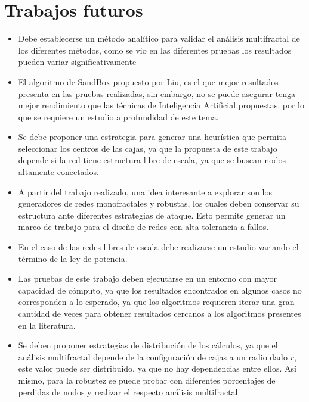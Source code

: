 \newpage
\section{Trabajos futuros}

\begin{itemize}
    \item Debe establecerse un método analítico para validar el análisis multifractal de los diferentes métodos, como se vio en las diferentes pruebas los resultados pueden variar significativamente
    \item El algoritmo de SandBox propuesto por Liu\cite{Liu2015}, es el que mejor resultados presenta en las pruebas realizadas, sin embargo, no se puede asegurar tenga mejor rendimiento que las técnicas de Inteligencia Artificial propuestas, por lo que se requiere un estudio a profundidad de este tema.
    \item Se debe proponer una estrategia para generar una heurística que permita seleccionar los centros de las cajas, ya que la propuesta de este trabajo depende si la red tiene estructura libre de escala, ya que se buscan nodos altamente conectados.
    \item A partir del trabajo realizado, una idea interesante a explorar son los generadores de redes monofractales y robustas, los cuales deben conservar su estructura ante diferentes estrategias de ataque. Esto permite generar un marco de trabajo para el diseño de redes con alta tolerancia a fallos.
    \item En el caso de las redes libres de escala debe realizarse un estudio variando el término de la ley de potencia.
    \item Las pruebas de este trabajo deben ejecutarse en un entorno con mayor capacidad de cómputo, ya que los resultados encontrados en algunos casos no corresponden a lo esperado, ya que los algoritmos requieren iterar una gran cantidad de veces para obtener resultados cercanos a los algoritmos presentes en la literatura.
    \item Se deben proponer estrategias de distribución de los cálculos, ya que el análisis multifractal depende de la configuración de cajas a un radio dado $r$, este valor puede ser distribuido, ya que no hay dependencias entre ellos. Así mismo, para la robustez se puede probar con diferentes porcentajes de perdidas de nodos y realizar el respecto análisis multifractal.
\end{itemize}
